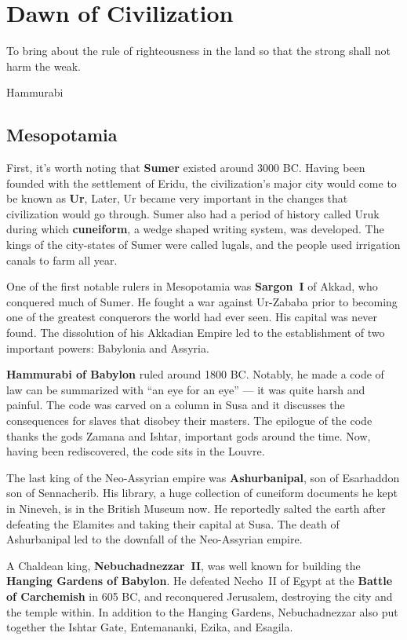 \chapter{Dawn of Civilization}

\epigraph{%
  To bring about the rule of righteousness in the land so that the strong shall not harm the weak.
}{Hammurabi}

\section{Mesopotamia}

First, it's worth noting that \textbf{Sumer} existed around 3000 BC\@.
Having been founded with the settlement of Eridu,
the civilization's major city would come to be known as \textbf{Ur},
Later, Ur became very important in the changes that civilization would go through.
Sumer also had a period of history called Uruk during which \textbf{cuneiform},
a wedge shaped writing system, was developed.
The kings of the city-states of Sumer were called lugals,
and the people used irrigation canals to farm all year.

One of the first notable rulers in Mesopotamia was \textbf{Sargon~I} of Akkad,
who conquered much of Sumer.
He fought a war against Ur-Zababa
prior to becoming one of the greatest conquerors the world had ever seen.
His capital was never found.
The dissolution of his Akkadian Empire led to the establishment of two important powers:
Babylonia and Assyria.

\textbf{Hammurabi of Babylon} ruled around 1800 BC\@.
Notably, he made a code of law can be summarized with ``an eye for an eye''
--- it was quite harsh and painful.
The code was carved on a column in Susa
and it discusses the consequences for slaves that disobey their masters.
The epilogue of the code thanks the gods Zamana and Ishtar, important gods around the time.
Now, having been rediscovered, the code sits in the Louvre.

The last king of the Neo-Assyrian empire was \textbf{Ashurbanipal},
son of Esarhaddon son of Sennacherib.
His library, a huge collection of cuneiform documents he kept in Nineveh,
is in the British Museum now.
He reportedly salted the earth after defeating the Elamites and taking their capital at Susa.
The death of Ashurbanipal led to the downfall of the Neo-Assyrian empire.

A Chaldean king, \textbf{Nebuchadnezzar~II},
was well known for building the \textbf{Hanging Gardens of Babylon}.
He defeated Necho~II of Egypt at the \textbf{Battle of Carchemish} in 605 BC,
and reconquered Jerusalem, destroying the city and the temple within.
In addition to the Hanging Gardens,
Nebuchadnezzar also put together the Ishtar Gate, Entemananki, Ezika, and Esagila.

